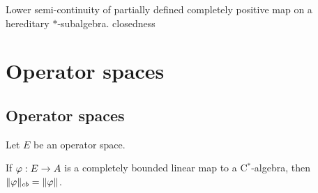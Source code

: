 \documentclass{../../large}
\begin{document}
\begin{prb}
Lower semi-continuity of partially defined completely positive map on a hereditary $*$-subalgebra.
closedness
\end{prb}






\chapter{Operator spaces}
\section{Operator spaces}

\begin{prb}
Let $E$ be an operator space.
\begin{parts}
\item If $\varphi:E\to A$ is a completely bounded linear map to a C$^*$-algebra, then $\|\varphi\|_{cb}=\|\varphi\|$.
\end{parts}
\end{prb}
\end{document}
